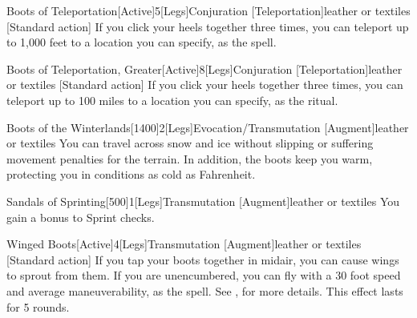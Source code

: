             \begin{magicitemdef}{Boots of Teleportation}[Active]{5}[Legs]{Conjuration [Teleportation]}{leather or textiles}
                [Standard action] If you click your heels together three times, you can teleport up to 1,000 feet to a location you can specify, as the  spell.
            \end{magicitemdef}

            \begin{magicitemdef}{Boots of Teleportation, Greater}[Active]{8}[Legs]{Conjuration [Teleportation]}{leather or textiles}
                [Standard action] If you click your heels together three times, you can teleport up to 100 miles to a location you can specify, as the  ritual.
            \end{magicitemdef}

            \begin{magicitemdef}{Boots of the Winterlands}[1400]{2}[Legs]{Evocation/Transmutation [Augment]}{leather or textiles}
                 You can travel across snow and ice without slipping or suffering movement penalties for the terrain.
                In addition, the boots keep you warm, protecting you in conditions as cold as  Fahrenheit.
            \end{magicitemdef}

            \begin{magicitemdef}{Sandals of Sprinting}[500]{1}[Legs]{Transmutation [Augment]}{leather or textiles}
                 You gain a  bonus to Sprint checks.
            \end{magicitemdef}

            \begin{magicitemdef}{Winged Boots}[Active]{4}[Legs]{Transmutation [Augment]}{leather or textiles}
                [Standard action] If you tap your boots together in midair, you can cause wings to sprout from them.
                If you are unencumbered, you can fly with a 30 foot speed and average maneuverability, as the  spell.
                See , for more details.
                This effect lasts for 5 rounds.
            \end{magicitemdef}

